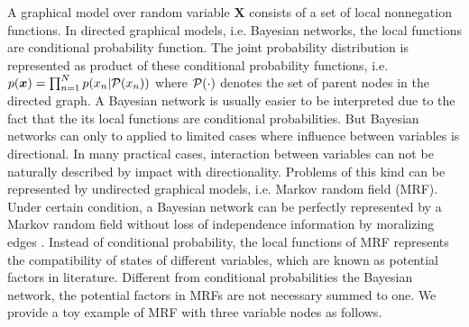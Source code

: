 A graphical model over random variable $\bm{X}$ consists of a set of local nonnegation functions. In directed graphical models, i.e. Bayesian networks, the local functions are conditional probability function. The joint probability distribution is represented as product of these conditional probability functions, i.e. $p(\bm{x}) = \prod_{n=1}^{N}p(x_n| \mathcal{P}(x_n))$ where $\mathcal{P}(\cdot)$ denotes the set of parent nodes in the directed graph. A Bayesian network is usually easier to be interpreted due to the fact that the its local functions are conditional probabilities. But Bayesian networks can only to applied to limited cases where influence between variables is directional. In many practical cases, interaction between variables can not be naturally described by impact with directionality. Problems of this kind can be represented by undirected graphical models, i.e. Markov random field (MRF). Under certain condition, a Bayesian network can be perfectly represented by a Markov random field without loss of independence information by moralizing edges \cite[Chapter~4.5]{koller2009pgm}. Instead of conditional probability, the local functions of MRF represents the compatibility of states of different variables, which are known as potential factors in literature. Different from conditional probabilities the Bayesian network, the potential factors in MRFs are not necessary summed to one. We provide a toy example of MRF with three variable nodes as follows.
